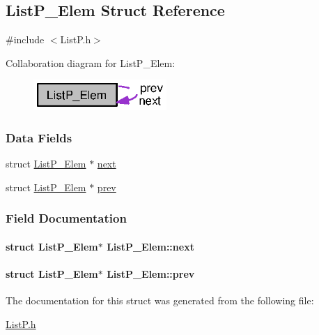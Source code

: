 \subsection{List\+P\+\_\+\+Elem Struct Reference}
\label{struct_list_p___elem}


{\ttfamily \#include $<$List\+P.\+h$>$}



Collaboration diagram for List\+P\+\_\+\+Elem\+:
\nopagebreak
\begin{figure}[H]
\begin{center}
\leavevmode
\includegraphics[width=143pt]{struct_list_p___elem__coll__graph}
\end{center}
\end{figure}
\subsubsection*{Data Fields}
\begin{DoxyCompactItemize}
\item 
struct \hyperlink{struct_list_p___elem}{List\+P\+\_\+\+Elem} $\ast$ \hyperlink{struct_list_p___elem_a6865121d422c60f141ccdff288257a8f}{next}
\item 
struct \hyperlink{struct_list_p___elem}{List\+P\+\_\+\+Elem} $\ast$ \hyperlink{struct_list_p___elem_a115359d9f00acd3255a2b35b25925318}{prev}
\end{DoxyCompactItemize}


\subsubsection{Field Documentation}
\paragraph[{next}]{\setlength{\rightskip}{0pt plus 5cm}struct {\bf List\+P\+\_\+\+Elem}$\ast$ List\+P\+\_\+\+Elem\+::next}\label{struct_list_p___elem_a6865121d422c60f141ccdff288257a8f}
\paragraph[{prev}]{\setlength{\rightskip}{0pt plus 5cm}struct {\bf List\+P\+\_\+\+Elem}$\ast$ List\+P\+\_\+\+Elem\+::prev}\label{struct_list_p___elem_a115359d9f00acd3255a2b35b25925318}


The documentation for this struct was generated from the following file\+:\begin{DoxyCompactItemize}
\item 
\hyperlink{_list_p_8h}{List\+P.\+h}\end{DoxyCompactItemize}
